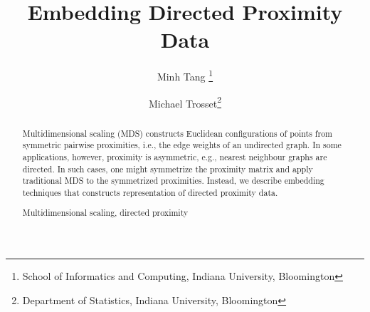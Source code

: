 \documentclass[11pt]{asaproc}
\title{Embedding Directed Proximity Data}
\author{Minh Tang \thanks{School of Informatics and Computing, Indiana
    University, Bloomington} \and Michael Trosset\thanks{Department of
    Statistics, Indiana University, Bloomington}}
\begin{document}
\maketitle
\begin{abstract}
Multidimensional scaling (MDS) constructs Euclidean configurations of
points from symmetric pairwise proximities, i.e., the edge weights of
an undirected graph. In some applications, however, proximity is
asymmetric, e.g., nearest neighbour graphs are directed. In such
cases, one might symmetrize the proximity matrix and apply traditional
MDS to the symmetrized proximities. Instead, we describe embedding
techniques that constructs representation of directed proximity data.
\begin{keywords}
Multidimensional scaling, directed proximity
\end{keywords}
\end{abstract}
\end{document}
